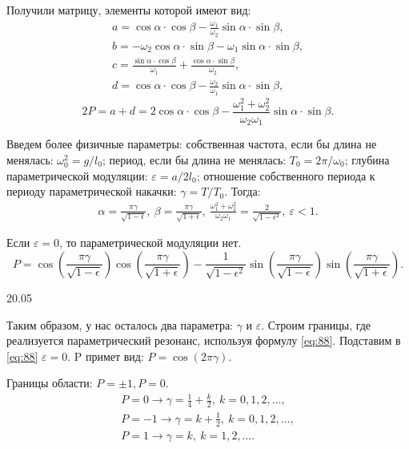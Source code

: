 Получили матрицу, элементы которой имеют вид:
\begin{gather*}
	a=\cos \alpha \cdot \cos \beta -\frac{\omega_1}{\omega_2} \sin \alpha \cdot \sin \beta, \\
	b=-\omega_2 \cos \alpha \cdot \sin \beta - \omega_1 \sin \alpha \cdot \sin \beta, \\
	c=\frac{\sin \alpha \cdot \cos \beta}{\omega_1}+\frac{\cos \alpha \cdot \sin \beta}{\omega_2}, \\
	d=\cos \alpha \cdot \cos \beta-\frac{\omega_2}{\omega_1}\sin \alpha \cdot \sin \beta,
\end{gather*}
\begin{equation}
	2P=a+d=2\cos \alpha\cdot \cos \beta - \frac{\omega_1^2+\omega_2^2}{\omega_2 \omega_1} \sin \alpha \cdot \sin \beta.
	\label{eq:87}	
\end{equation}

Введем более физичные параметры: собственная частота, если бы длина не менялась: $\omega_0^2=g/l_0$; период, если бы длина не менялась: $T_0=2\pi /\omega_0$; глубина параметрической модуляции: $\varepsilon=a/2l_0$; отношение собственного периода к периоду параметрической накачки: $\gamma=T/T_0$. Тогда:
\begin{gather*}
	\alpha=\frac{\pi \gamma}{\sqrt{1-\epsilon}},~\beta=\frac{\pi \gamma}{\sqrt{1+\epsilon}},~\frac{\omega_1^2+\omega_2^2}{\omega_2 \omega_1}=\frac{2}{\sqrt{1-\epsilon^2}},~\varepsilon<1.
\end{gather*}

Если $\varepsilon=0$, то параметрической модуляции нет.
\begin{equation}
	P=\cos(\frac{\pi \gamma}{\sqrt{1-\epsilon}}) \cos (\frac{\pi \gamma}{\sqrt{1+\epsilon}}) - \frac{1}{\sqrt{1-\epsilon^2}} \sin(\frac{\pi \gamma}{\sqrt{1-\epsilon}}) \sin (\frac{\pi \gamma}{\sqrt{1+\epsilon}}).
	\label{eq:88}	
\end{equation}

20.05

Таким образом, у нас осталось два параметра: $\gamma$ и $\varepsilon$. Строим границы, где реализуется параметрический резонанс, используя формулу \eqref{eq:88}. Подставим в \eqref{eq:88} $\varepsilon=0$. P примет вид: $P=\cos(2\pi \gamma)$.

Границы области: $P=\pm1, P=0$.
\begin{gather*}
	P=0 \rightarrow	\gamma=\frac14+\frac{k}2,~k=0,1,2,\dots, \\
	P=-1 \rightarrow	\gamma=k+\frac12,~k=0,1,2,\dots, \\
	P=1 \rightarrow	\gamma=k,~k=1,2,\dots.
\end{gather*}

